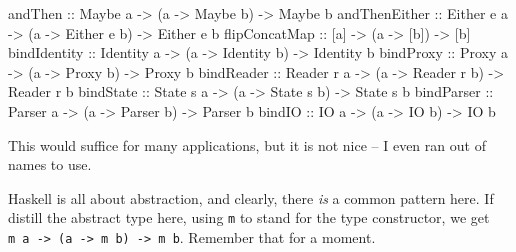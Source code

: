 \documentclass[11pt,
  american,
  DIV13]{article}
\newenvironment{Shaded}{}{}
\newcommand{\DataTypeTok}[1]{\textcolor[rgb]{0.56,0.13,0.00}{#1}}
\newcommand{\NormalTok}[1]{#1}
\newcommand{\OtherTok}[1]{\textcolor[rgb]{0.00,0.44,0.13}{#1}}
\begin{document}
\begin{Shaded}
\begin{Highlighting}[]
\OtherTok{andThen ::} \DataTypeTok{Maybe}\NormalTok{ a }\OtherTok{{-}\textgreater{}}\NormalTok{ (a }\OtherTok{{-}\textgreater{}} \DataTypeTok{Maybe}\NormalTok{ b) }\OtherTok{{-}\textgreater{}} \DataTypeTok{Maybe}\NormalTok{ b}
\OtherTok{andThenEither ::} \DataTypeTok{Either}\NormalTok{ e a }\OtherTok{{-}\textgreater{}}\NormalTok{ (a }\OtherTok{{-}\textgreater{}} \DataTypeTok{Either}\NormalTok{ e b) }\OtherTok{{-}\textgreater{}} \DataTypeTok{Either}\NormalTok{ e b}
\OtherTok{flipConcatMap ::}\NormalTok{ [a] }\OtherTok{{-}\textgreater{}}\NormalTok{ (a }\OtherTok{{-}\textgreater{}}\NormalTok{ [b]) }\OtherTok{{-}\textgreater{}}\NormalTok{ [b]}
\OtherTok{bindIdentity ::} \DataTypeTok{Identity}\NormalTok{ a }\OtherTok{{-}\textgreater{}}\NormalTok{ (a }\OtherTok{{-}\textgreater{}} \DataTypeTok{Identity}\NormalTok{ b) }\OtherTok{{-}\textgreater{}} \DataTypeTok{Identity}\NormalTok{ b}
\OtherTok{bindProxy ::} \DataTypeTok{Proxy}\NormalTok{ a }\OtherTok{{-}\textgreater{}}\NormalTok{ (a }\OtherTok{{-}\textgreater{}} \DataTypeTok{Proxy}\NormalTok{ b) }\OtherTok{{-}\textgreater{}} \DataTypeTok{Proxy}\NormalTok{ b}
\OtherTok{bindReader ::} \DataTypeTok{Reader}\NormalTok{ r a }\OtherTok{{-}\textgreater{}}\NormalTok{ (a }\OtherTok{{-}\textgreater{}} \DataTypeTok{Reader}\NormalTok{ r b) }\OtherTok{{-}\textgreater{}} \DataTypeTok{Reader}\NormalTok{ r b}
\OtherTok{bindState ::} \DataTypeTok{State}\NormalTok{ s a }\OtherTok{{-}\textgreater{}}\NormalTok{ (a }\OtherTok{{-}\textgreater{}} \DataTypeTok{State}\NormalTok{ s b) }\OtherTok{{-}\textgreater{}} \DataTypeTok{State}\NormalTok{ s b}
\OtherTok{bindParser ::} \DataTypeTok{Parser}\NormalTok{ a }\OtherTok{{-}\textgreater{}}\NormalTok{ (a }\OtherTok{{-}\textgreater{}} \DataTypeTok{Parser}\NormalTok{ b) }\OtherTok{{-}\textgreater{}} \DataTypeTok{Parser}\NormalTok{ b}
\OtherTok{bindIO ::} \DataTypeTok{IO}\NormalTok{ a }\OtherTok{{-}\textgreater{}}\NormalTok{ (a }\OtherTok{{-}\textgreater{}} \DataTypeTok{IO}\NormalTok{ b) }\OtherTok{{-}\textgreater{}} \DataTypeTok{IO}\NormalTok{ b}
\end{Highlighting}
\end{Shaded}

This would suffice for many applications, but it is not nice -- I even
ran out of names to use.

Haskell is all about abstraction, and clearly, there \emph{is} a common
pattern here. If distill the abstract type here, using \texttt{m} to
stand for the type constructor, we get
\texttt{m\ a\ -\textgreater{}\ (a\ -\textgreater{}\ m\ b)\ -\textgreater{}\ m\ b}.
Remember that for a moment.
\end{document}
